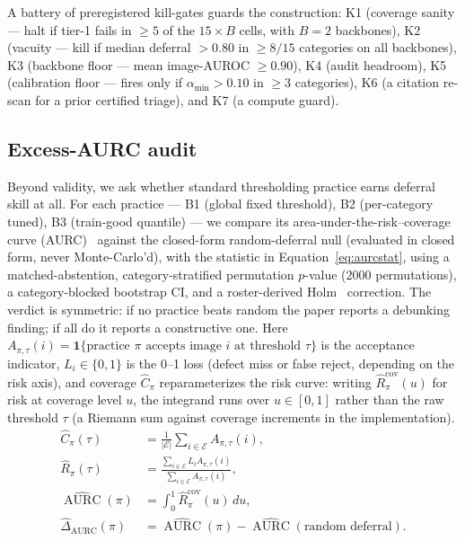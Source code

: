 \documentclass[preprint,11pt]{elsarticle}
\begin{document}
A battery of preregistered kill-gates guards the construction: K1 (coverage sanity --- halt if
tier-1 fails in $\ge 5$ of the $15\!\times\!B$ cells, with $B=2$ backbones), K2 (vacuity --- kill if median deferral
$>0.80$ in $\ge 8/15$ categories on all backbones), K3 (backbone floor --- mean image-AUROC
$\ge 0.90$), K4 (audit headroom), K5 (calibration floor --- fires only if $\alpha_{\min}>0.10$ in
$\ge 3$ categories), K6 (a citation re-scan for a prior certified triage), and K7 (a compute guard).

\subsection{Excess-AURC audit}
\label{sec:audit}

Beyond validity, we ask whether standard thresholding practice earns deferral skill at all.
For each practice --- B1 (global fixed threshold), B2 (per-category tuned), B3 (train-good quantile)
--- we compare its area-under-the-risk--coverage curve
(AURC)~\citep{geifman2017selective} against the closed-form random-deferral null
(evaluated in closed form, never Monte-Carlo'd), with the statistic in
Equation~\eqref{eq:aurcstat}, using a matched-abstention,
category-stratified permutation $p$-value ($2000$ permutations), a category-blocked bootstrap CI,
and a roster-derived Holm~\citep{holm1979simple} correction. The verdict is symmetric: if no
practice beats random the paper reports a debunking finding; if all do it reports a constructive one.
Here $A_{\pi,\tau}(i)=\mathbf{1}\{\text{practice $\pi$ accepts image $i$ at threshold $\tau$}\}$ is the
acceptance indicator, $L_i\in\{0,1\}$ is the 0--1 loss (defect miss or false reject, depending on
the risk axis), and coverage $\widehat C_{\pi}$ reparameterizes the risk curve: writing
$\widehat R_{\pi}^{\text{cov}}(u)$ for risk at coverage level $u$, the integrand runs over
$u\in[0,1]$ rather than the raw threshold $\tau$ (a Riemann sum against coverage increments in
the implementation).
\begin{equation}
\begin{aligned}
\widehat C_{\pi}(\tau)
&=\frac{1}{|\mathcal E|}\sum_{i\in\mathcal E} A_{\pi,\tau}(i),\\
\widehat R_{\pi}(\tau)
&=\frac{\sum_{i\in\mathcal E} L_i A_{\pi,\tau}(i)}
{\sum_{i\in\mathcal E} A_{\pi,\tau}(i)},\\
\widehat{\operatorname{AURC}}(\pi)
&=\int_0^1 \widehat R_{\pi}^{\text{cov}}(u)\,du,\\
\widehat{\Delta}_{\text{AURC}}(\pi)
&=\widehat{\operatorname{AURC}}(\pi)
-\widehat{\operatorname{AURC}}(\text{random deferral}).
\end{aligned}
\label{eq:aurcstat}
\end{equation}
\end{document}
